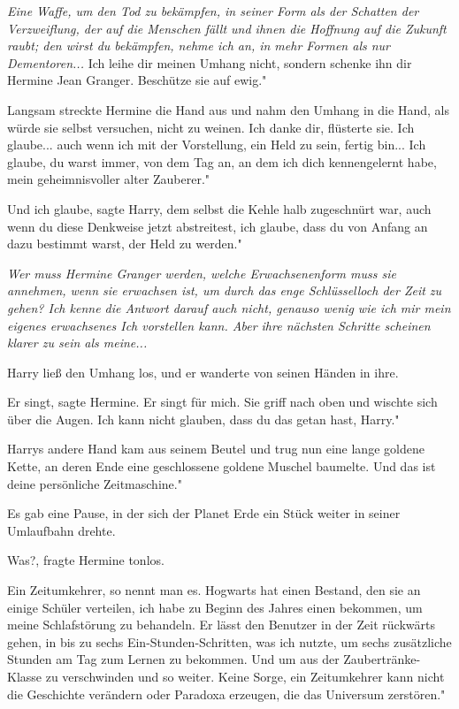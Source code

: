 \emph{Eine Waffe, um den Tod zu bekämpfen, in seiner Form als der Schatten der
Verzweiflung, der auf die Menschen fällt und ihnen die Hoffnung auf die Zukunft
raubt; den wirst du bekämpfen, nehme ich an, in mehr Formen als nur
Dementoren...} \glqq{}Ich leihe dir meinen Umhang nicht, sondern schenke ihn dir
Hermine Jean Granger. Beschütze sie auf ewig."

Langsam streckte Hermine die Hand aus und nahm den Umhang in die Hand, als würde
sie selbst versuchen, nicht zu weinen. \glqq{}Ich danke dir\grqq{}, flüsterte
sie. \glqq{}Ich glaube... auch wenn ich mit der Vorstellung, ein Held zu sein,
fertig bin... Ich glaube, du warst immer, von dem Tag an, an dem ich dich
kennengelernt habe, mein geheimnisvoller alter Zauberer."

\glqq{}Und ich glaube\grqq{}, sagte Harry, dem selbst die Kehle halb zugeschnürt
war, \glqq{}auch wenn du diese Denkweise jetzt abstreitest, ich glaube, dass du
von Anfang an dazu bestimmt warst, der Held zu werden."

\emph{Wer muss Hermine Granger werden, welche Erwachsenenform muss sie annehmen,
wenn sie erwachsen ist, um durch das enge Schlüsselloch der Zeit zu gehen? Ich
kenne die Antwort darauf auch nicht, genauso wenig wie ich mir mein eigenes
erwachsenes Ich vorstellen kann. Aber ihre nächsten Schritte scheinen klarer zu
sein als meine...}

Harry ließ den Umhang los, und er wanderte von seinen Händen in ihre.

\glqq{}Er singt\grqq{}, sagte Hermine. \glqq{}Er singt für mich.\grqq{} Sie griff
nach oben und wischte sich über die Augen. \glqq{}Ich kann nicht glauben, dass du
das getan hast, Harry."

Harrys andere Hand kam aus seinem Beutel und trug nun eine lange goldene Kette,
an deren Ende eine geschlossene goldene Muschel baumelte. \glqq{}Und das ist
deine persönliche Zeitmaschine."

Es gab eine Pause, in der sich der Planet Erde ein Stück weiter in seiner
Umlaufbahn drehte.

\glqq{}Was?\grqq{}, fragte Hermine tonlos.

\glqq{}Ein Zeitumkehrer, so nennt man es. Hogwarts hat einen Bestand, den sie an
einige Schüler verteilen, ich habe zu Beginn des Jahres einen bekommen, um meine
Schlafstörung zu behandeln. Er lässt den Benutzer in der Zeit rückwärts gehen,
in bis zu sechs Ein-Stunden-Schritten, was ich nutzte, um sechs zusätzliche
Stunden am Tag zum Lernen zu bekommen. Und um aus der Zaubertränke-Klasse zu
verschwinden und so weiter. Keine Sorge, ein Zeitumkehrer kann nicht die
Geschichte verändern oder Paradoxa erzeugen, die das Universum zerstören."

